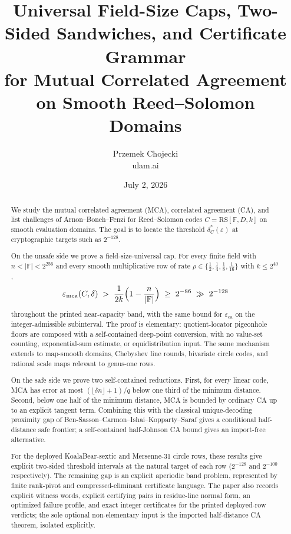 \documentclass[11pt]{article}
\title{Universal Field-Size Caps, Two-Sided Sandwiches, and Certificate Grammar\\
for Mutual Correlated Agreement on Smooth Reed--Solomon Domains}
\author{Przemek Chojecki\\ \small ulam.ai}
\date{July 2, 2026}
\theoremstyle{definition}
\theoremstyle{remark}
\newcommand{\F}{\mathbb{F}}
\newcommand{\RS}{\mathrm{RS}}
\newcommand{\eca}{\varepsilon_{\mathrm{ca}}}
\newcommand{\emca}{\varepsilon_{\mathrm{mca}}}
\begin{document}
\maketitle

\begin{abstract}
We study the mutual correlated agreement (MCA), correlated agreement (CA), and list challenges of Arnon--Boneh--Fenzi \cite{ABF26} for Reed--Solomon codes $C=\RS[\F,D,k]$ on smooth evaluation domains.  The goal is to locate the threshold $\delta_C^*(\varepsilon)$ at cryptographic targets such as $2^{-128}$.

On the unsafe side we prove a field-size-universal cap.  For every finite field with $n<|\F|<2^{256}$ and every smooth multiplicative row of rate $\rho\in\{\frac12,\frac14,\frac18,\frac1{16}\}$ with $k\le2^{40}$,
\[
\emca(C,\delta)\;>\;\frac1{2k}\Bigl(1-\frac n{|\F|}\Bigr)\;\ge\;2^{-86}\;\gg\;2^{-128}
\]
throughout the printed near-capacity band, with the same bound for $\eca$ on the integer-admissible subinterval.  The proof is elementary: quotient-locator pigeonhole floors are composed with a self-contained deep-point conversion, with no value-set counting, exponential-sum estimate, or equidistribution input.  The same mechanism extends to map-smooth domains, Chebyshev line rounds, bivariate circle codes, and rational scale maps relevant to genus-one rows.

On the safe side we prove two self-contained reductions.  First, for every linear code, MCA has error at most $(\lfloor\delta n\rfloor+1)/q$ below one third of the minimum distance.  Second, below one half of the minimum distance, MCA is bounded by ordinary CA up to an explicit tangent term.  Combining this with the classical unique-decoding proximity gap of Ben-Sasson--Carmon--Ishai--Kopparty--Saraf \cite{BCIKS20} gives a conditional half-distance safe frontier; a self-contained half-Johnson CA bound gives an import-free alternative.

For the deployed KoalaBear-sextic and Mersenne-$31$ circle rows, these results give explicit two-sided threshold intervals at the natural target of each row ($2^{-128}$ and $2^{-100}$ respectively).  The remaining gap is an explicit aperiodic band problem, represented by finite rank-pivot and compressed-eliminant certificate language.  The paper also records explicit witness words, explicit certifying pairs in residue-line normal form, an optimized failure profile, and exact integer certificates for the printed deployed-row verdicts; the sole optional non-elementary input is the imported half-distance CA theorem, isolated explicitly.
\end{abstract}
\end{document}
